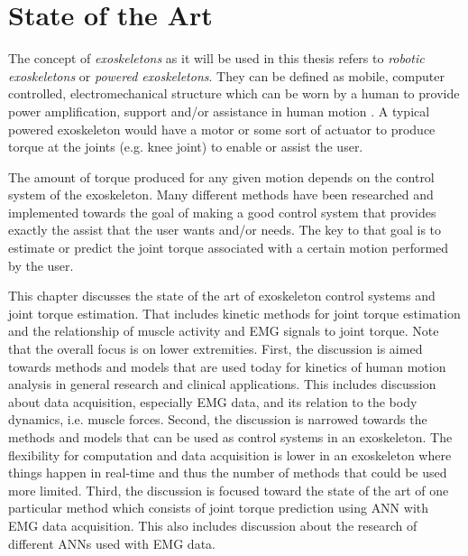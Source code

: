 \documentclass[../main.tex]{subfiles}
\begin{document}
\chapter{State of the Art}
The concept of \textit{exoskeletons} as it will be used in this thesis refers to \textit{robotic exoskeletons} or \textit{powered exoskeletons}. 
They can be defined as mobile, computer controlled, electromechanical structure which can be worn by a human to provide power amplification, support and/or assistance in human motion \cite{Anam2012, Gorgey2018}. 
A typical powered exoskeleton would have a motor or some sort of actuator to produce torque at the joints (e.g. knee joint) to enable or assist the user.

The amount of torque produced for any given motion depends on the control system of the exoskeleton.
Many different methods have been researched and implemented towards the goal of making a good control system that provides exactly the assist that the user wants and/or needs.
The key to that goal is to estimate or predict the joint torque associated with a certain motion performed by the user.

This chapter discusses the state of the art of exoskeleton control systems and joint torque estimation.
That includes kinetic methods for joint torque estimation and the relationship of muscle activity and \ac{EMG} signals to joint torque.
Note that the overall focus is on lower extremities.
First, the discussion is aimed towards methods and models that are used today for kinetics of human motion analysis in general research and clinical applications.
This includes discussion about data acquisition, especially \ac{EMG} data, and its relation to the body dynamics, i.e. muscle forces.
Second, the discussion is narrowed towards the methods and models that can be used as control systems in an exoskeleton.
The flexibility for computation and data acquisition is lower in an exoskeleton where things happen in real-time and thus the number of methods that could be used more limited.
Third, the discussion is focused toward the state of the art of one particular method which consists of joint torque prediction using \ac{ANN} with \ac{EMG} data acquisition. 
This also includes discussion about the research of different \acp{ANN} used with \ac{EMG} data.
\end{document}
